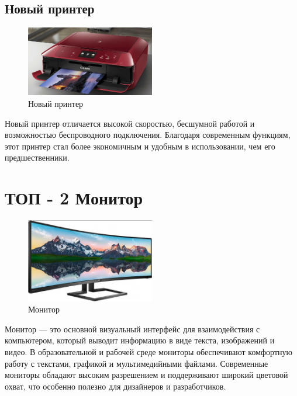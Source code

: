 \documentclass[14pt]{extreport}
\begin{document}
    \subsection{Новый принтер}
    \begin{figure}[h]
        \centering
        \includegraphics[width=0.5\textwidth]{printernovi.png}
        \caption{Новый принтер}
        \label{fig:example1}
    \end{figure}
    Новый принтер отличается высокой скоростью, бесшумной работой и возможностью беспроводного подключения. Благодаря современным функциям, этот принтер стал более экономичным и удобным в использовании, чем его предшественники.

    \section{ТОП - 2 Монитор}
    \begin{figure}[h]
        \centering
        \includegraphics[width=0.5\textwidth]{monitor.png}
        \caption{Монитор}
        \label{fig:example1}
    \end{figure}
    Монитор — это основной визуальный интерфейс для взаимодействия с компьютером, который выводит информацию в виде текста, изображений и видео. В образовательной и рабочей среде мониторы обеспечивают комфортную работу с текстами, графикой и мультимедийными файлами. Современные мониторы обладают высоким разрешением и поддерживают широкий цветовой охват, что особенно полезно для дизайнеров и разработчиков.
    
\end{document}
